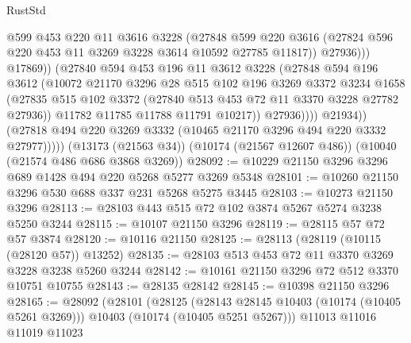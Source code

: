 \begin{lexlean}{RustStd}
\begin{coremodule}
                              @599
                              @453
                              @220
                              @11
                              @3616
                              @3228
                              (@27848
                                @599
                                @220
                                @3616
                                (@27824 @596 @220 @453 @11 @3269 @3228 @3614 @10592 @27785 @11817))
                              @27936)))
                        @17869))
                    (@27840
                      @594
                      @453
                      @196
                      @11
                      @3612
                      @3228
                      (@27848
                        @594
                        @196
                        @3612
                        (@10072
                          @21170
                          @3296
                          @28
                          @515
                          @102
                          @196
                          @3269
                          @3372
                          @3234
                          @1658
                          (@27835
                            @515
                            @102
                            @3372
                            (@27840 @513 @453 @72 @11 @3370 @3228 @27782 @27936))
                          @11782
                          @11785
                          @11788
                          @11791
                          @10217))
                      @27936))))
              @21934))
          (@27818 @494 @220 @3269 @3332 (@10465 @21170 @3296 @494 @220 @3332 @27977)))))
    (@13173 (@21563 @34))
    (@10174 (@21567 @12607 @486))
    (@10040 (@21574 @486 @686 @3868 @3269))
@28092 := @10229 @21150 @3296 @3296 @689 @1428 @494 @220 @5268 @5277 @3269 @5348
@28101 := @10260 @21150 @3296 @530 @688 @337 @231 @5268 @5275 @3445
@28103 := @10273 @21150 @3296
@28113 := @28103 @443 @515 @72 @102 @3874 @5267 @5274 @3238 @5250 @3244
@28115 := @10107 @21150 @3296
@28119 := @28115 @57 @72 @57 @3874
@28120 := @10116 @21150
@28125 := @28113 (@28119 (@10115 (@28120 @57)) @13252)
@28135 := @28103 @513 @453 @72 @11 @3370 @3269 @3228 @3238 @5260 @3244
@28142 := @10161 @21150 @3296 @72 @512 @3370 @10751 @10755
@28143 := @28135 @28142
@28145 := @10398 @21150 @3296
@28165 := @28092
    (@28101
      (@28125
        (@28143 @28145 @10403 (@10174 (@10405 @5261 @3269)))
        @10403
        (@10174 (@10405 @5251 @5267)))
      @11013
      @11016
      @11019
      @11023

\end{coremodule}
\end{lexlean}
